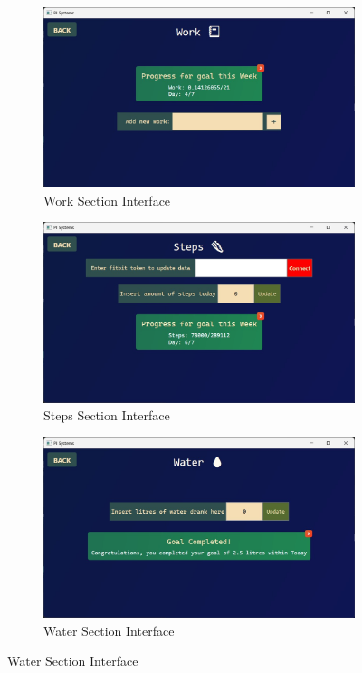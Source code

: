 \documentclass[12pt]{article}
\begin{document}
\begin{figure}[h!]
  \centering
  \begin{subfigure}{0.4\linewidth}
    \includegraphics[width = \linewidth]{Work Screen}
    \caption{Work Section Interface}
    \label{fig:Work}
  \end{subfigure}
  \hfill

  \begin{subfigure}{0.4\linewidth}
    \includegraphics[width = \linewidth]{Steps Screen}
    \caption{Steps Section Interface}
    \label{fig:Steps}
  \end{subfigure}
  \hfill

  \begin{subfigure}{0.4\linewidth}
    \includegraphics[width = \linewidth]{Water Screen}
    \caption{Water Section Interface}
    \label{fig:Water}
  \end{subfigure}
  \hfill


\end{figure}
\end{document}
